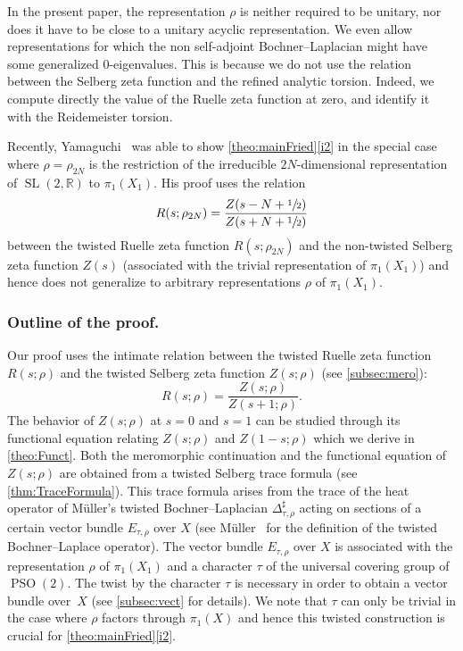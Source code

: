 \documentclass[10pt]{amsart}
\theoremstyle{plain}
\theoremstyle{definition}
\theoremstyle{remark}
\newcommand{\R}{\mathbb{R}}
\DeclareMathOperator{\SL}{SL}
\DeclareMathOperator{\PSO}{PSO}
\numberwithin{equation}{section}
\begin{document}
In the present paper, the representation $\rho$ is neither required to be unitary, nor does it have to be close to a unitary acyclic representation. We even allow representations for which the non self-adjoint Bochner--Laplacian might have some generalized $0$\nobreakdash-eigenvalues.
This is because we do not use the relation between the Selberg zeta function and the refined analytic torsion. Indeed, we compute directly the value of the Ruelle zeta function at zero, and identify it with the Reidemeister torsion.

Recently, Yamaguchi~\cite{yamaguchi2020dynamical} was able to show \cref{theo:mainFried}\eqref{i2} in the special case where $\rho=\rho_{2N}$ is the restriction of the irreducible $2N$-dimensional representation of $\SL(2,\R)$ to $\pi_1(X_1)$.
His proof uses the relation
\[
R(s;\rho_{2N}) = \frac{Z(s-N+\sfrac{1}{2})}{Z(s+N+\sfrac{1}{2})}
\]
between the twisted Ruelle zeta function $R(s;\rho_{2N})$ and the non-twisted Selberg zeta function $Z(s)$ (associated with the trivial representation of $\pi_1(X_1)$) and hence does not generalize to arbitrary representations $\rho$ of $\pi_1(X_1)$.


\subsubsection*{Outline of the proof.}

Our proof uses the intimate relation between the twisted Ruelle zeta function $R(s;\rho)$ and the twisted Selberg zeta function $Z(s;\rho)$ (see \cref{subsec:mero}):
\[
R(s;\rho) = \frac{Z(s;\rho)}{Z(s+1;\rho)}.
\]
The behavior of $Z(s;\rho)$ at $s=0$ and $s=1$ can be studied through its functional equation relating $Z(s;\rho)$ and $Z(1-s;\rho)$ which we derive in \cref{theo:Funct}. Both the meromorphic continuation and the functional equation of $Z(s;\rho)$ are obtained from a twisted Selberg trace formula (see \cref{thm:TraceFormula}). This trace formula arises from the trace of the heat operator of Müller's twisted Bochner--Laplacian $\Delta_{\tau,\rho}^\sharp$ acting on sections of a certain vector bundle $E_{\tau,\rho}$ over $X$ (see Müller~\cite[\S 4]{M1} for the definition of the twisted Bochner--Laplace operator). The vector bundle $E_{\tau,\rho}$ over $X$ is associated with the representation $\rho$ of $\pi_1(X_1)$ and a character $\tau$ of the universal covering group of $\PSO(2)$. The twist by the character $\tau$ is necessary in order to obtain a vector bundle over~$X$ (see \cref{subsec:vect} for details). We note that $\tau$ can only be trivial in the case where $\rho$ factors through $\pi_1(X)$ and hence this twisted construction is crucial for \cref{theo:mainFried}\eqref{i2}.
\end{document}
